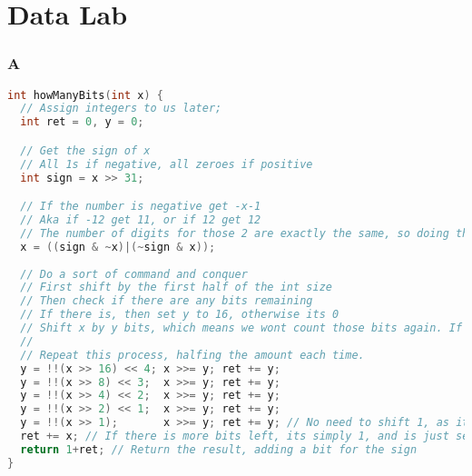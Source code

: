 \documentclass[11pt]{report}
\begin{document}

\tableofcontents
\newpage

\chapter{Data Lab}
\subsection{A}
\begin{lstlisting}[language=C]
int howManyBits(int x) {
  // Assign integers to us later;
  int ret = 0, y = 0;

  // Get the sign of x
  // All 1s if negative, all zeroes if positive
  int sign = x >> 31;

  // If the number is negative get -x-1 
  // Aka if -12 get 11, or if 12 get 12
  // The number of digits for those 2 are exactly the same, so doing this just makes it significantly easier to work with
  x = ((sign & ~x)|(~sign & x));
 
  // Do a sort of command and conquer
  // First shift by the first half of the int size
  // Then check if there are any bits remaining
  // If there is, then set y to 16, otherwise its 0
  // Shift x by y bits, which means we wont count those bits again. If there was less than 16 bits, nothing happens.
  //  
  // Repeat this process, halfing the amount each time. 
  y = !!(x >> 16) << 4; x >>= y; ret += y;
  y = !!(x >> 8) << 3;  x >>= y; ret += y;
  y = !!(x >> 4) << 2;  x >>= y; ret += y;
  y = !!(x >> 2) << 1;  x >>= y; ret += y;
  y = !!(x >> 1);       x >>= y; ret += y; // No need to shift 1, as it would be by 0
  ret += x; // If there is more bits left, its simply 1, and is just set to x
  return 1+ret; // Return the result, adding a bit for the sign
}
\end{lstlisting}
\end{document}
